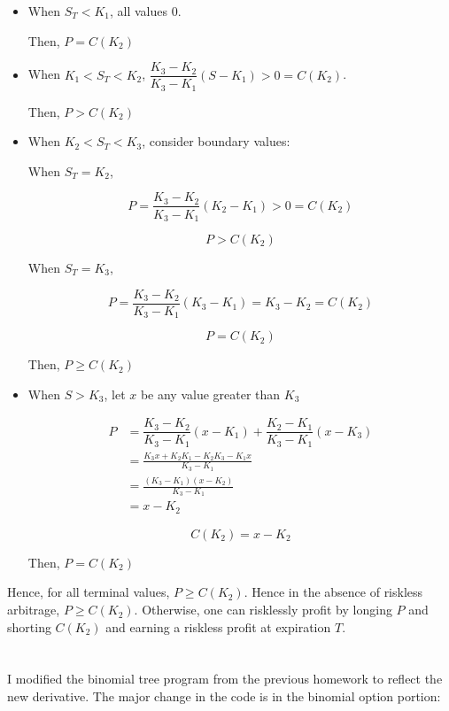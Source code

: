 \documentclass[11pt]{scrartcl}
\newcommand{\portfolio}[2]{\ensuremath{\dfrac{K_3-K_2}{K_3-K_1}#1 + \dfrac{K_2-K_1}{K_3-K_1}#2}}
\newcommand{\leftportfolio}[1]{\ensuremath{\dfrac{K_3-K_2}{K_3-K_1}#1}}
\begin{document}
\begin{itemize}
\item When $S_T < K_1$, all values 0.

Then, $P = C(K_2)$

\item When $K_1 < S_T < K_2$, $\leftportfolio{(S-K_1)} > 0 = C(K_2)$. 

Then, $P > C(K_2)$

\item When $K_2 < S_T < K_3$, consider boundary values:

When $S_T = K_2$,

\[P = \leftportfolio{(K_2 - K_1)} > 0 = C(K_2)\]

\[P > C(K_2)\]

When $S_T = K_3$,

\[P = \leftportfolio{(K_3 - K_1)} = K_3 - K_2 = C(K_2)\]

\[P = C(K_2)\]

Then, $P \geq C(K_2)$

\item When $S>K_3$, let $x$ be any value greater than $K_3$

\begin{align*}
P &= \portfolio{(x-K_1)}{(x-K_3)} \\
&= \frac{K_3x + K_2K_1 - K_2K_3 - K_1x}{K_3 - K_1} \\
&= \frac{(K_3-K_1)(x-K_2)}{K_3-K_1} \\
&= x - K_2
\end{align*}

\[C(K_2) = x-K_2\]

Then, $P = C(K_2)$
\end{itemize}

Hence, for all terminal values, $P \geq C(K_2)$. Hence in the absence of riskless arbitrage, $P \geq C(K_2)$. Otherwise, one can risklessly profit by longing $P$ and shorting $C(K_2)$ and earning a riskless profit at expiration $T$.

\section{}

I modified the binomial tree program from the previous homework to reflect the new derivative. The major change in the code is in the binomial option portion:
\end{document}
